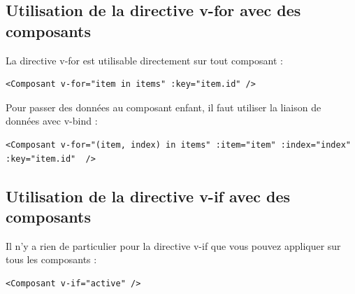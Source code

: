 \documentclass{article}
\begin{document}
\subsection{Utilisation de la directive {\color{monOrange}v-for} avec des composants}
La directive {\color{monOrange}v-for} est utilisable directement sur tout composant :
\begin{verbatim}
<Composant v-for="item in items" :key="item.id" />
\end{verbatim}
Pour passer des données au composant enfant, il faut utiliser la liaison de données avec {\color{monOrange}v-bind} :
\begin{verbatim}
<Composant v-for="(item, index) in items" :item="item" :index="index" :key="item.id"  />
\end{verbatim}

\subsection{Utilisation de la directive {\color{monOrange}v-if} avec des composants}
Il n'y a rien de particulier pour la directive {\color{monOrange}v-if} que vous pouvez appliquer sur tous les composants :
\begin{verbatim}
<Composant v-if="active" />
\end{verbatim}

\end{document}
